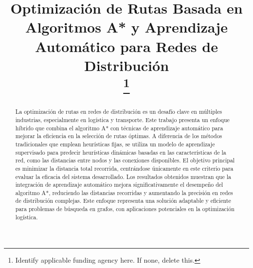 \documentclass[conference]{IEEEtran}
\begin{document}
	
	\title{Optimización de Rutas Basada en Algoritmos A* y Aprendizaje Automático para Redes de Distribución\\
		
		\thanks{Identify applicable funding agency here. If none, delete this.}
	}
	\author{
		\and
		\and
	}
	
	\maketitle
	
	\begin{abstract}
		La optimización de rutas en redes de distribución es un desafío clave en múltiples industrias, especialmente en logística y transporte. Este trabajo presenta un enfoque híbrido que combina el algoritmo A* con técnicas de aprendizaje automático para mejorar la eficiencia en la selección de rutas óptimas. A diferencia de los métodos tradicionales que emplean heurísticas fijas, se utiliza un modelo de aprendizaje supervisado para predecir heurísticas dinámicas basadas en las características de la red, como las distancias entre nodos y las conexiones disponibles. El objetivo principal es minimizar la distancia total recorrida, centrándose únicamente en este criterio para evaluar la eficacia del sistema desarrollado. Los resultados obtenidos muestran que la integración de aprendizaje automático mejora significativamente el desempeño del algoritmo A*, reduciendo las distancias recorridas y aumentando la precisión en redes de distribución complejas. Este enfoque representa una solución adaptable y eficiente para problemas de búsqueda en grafos, con aplicaciones potenciales en la optimización logística.
	\end{abstract}
	
\end{document}
